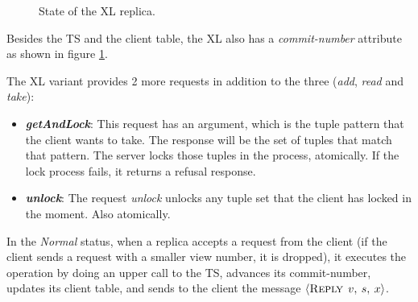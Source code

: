 \documentclass[times, 10pt,twocolumn]{article}
\begin{document}
 \label{xl_normal}
\begin{figure}[h]
   \caption{State of the XL replica.}
   \label{fig:state_xl}
\end{figure}

Besides the TS and the client table, the XL also has a \textit{commit-number} attribute as shown 
in figure \ref{fig:state_xl}.

The XL variant provides 2 more requests in addition to the three (\textit{add}, \textit{read} and \textit{take}):
\begin{itemize}
  \item \textit{\textbf{getAndLock}}: This request has an argument,
  which is the tuple pattern that the client wants to take. The response will be the set of tuples 
  that match that pattern. The server locks those tuples in the process, atomically. If the lock process
  fails, it returns a refusal response.
  
  \item \textit{\textbf{unlock}}: The request \textit{unlock} unlocks any tuple set that the client
  has locked in the moment. Also atomically.
  
\end{itemize}

In the \textit{Normal} status, when a replica accepts a request from the client (if the client sends a request 
with a smaller view number, it is dropped), it executes the operation by doing an upper call to 
the TS, advances its commit-number, updates its client table, and sends to the client the message
$\left \langle \textsc{Reply} \: \: v, \: s, \: x\right \rangle$.
\end{document}
